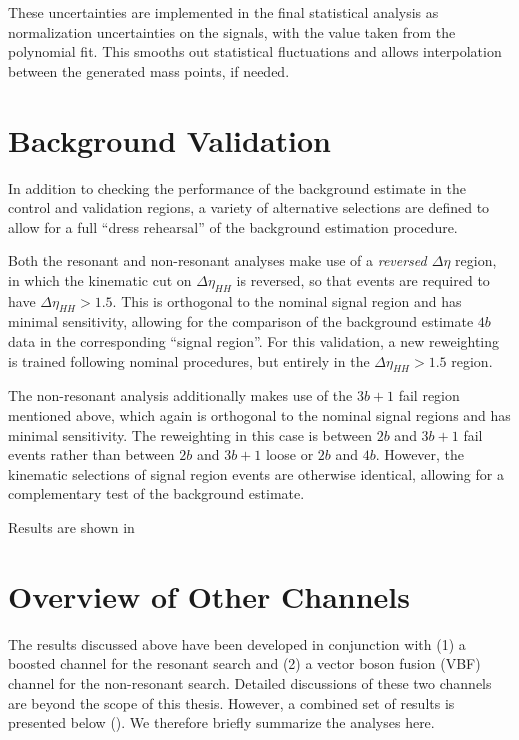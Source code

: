 These uncertainties are implemented in the final statistical analysis as normalization
uncertainties on the signals, with the value taken from the polynomial fit. This smooths
out statistical fluctuations and allows interpolation between the generated mass points, if needed.


\section{Background Validation}
In addition to checking the performance of the background estimate in the control and 
validation regions, a variety of alternative selections are defined to allow for a 
full ``dress rehearsal'' of the background estimation procedure. 

Both the resonant and non-resonant analyses make use of a \emph{reversed $\Delta \eta$}
region, in which the kinematic cut on $\Delta \eta_{HH}$ is reversed, so that events are
required to have $\Delta \eta_{HH} > 1.5$. This is orthogonal to the nominal signal 
region and has minimal sensitivity, allowing for the comparison of the background
estimate $4b$ data in the corresponding ``signal region''. For this validation, 
a new reweighting is trained following nominal procedures, but entirely in the 
$\Delta \eta_{HH} > 1.5$ region.

The non-resonant analysis additionally makes use of the $3b+1$ fail region mentioned 
above, which again is orthogonal to the nominal signal regions and has minimal sensitivity.
The reweighting in this case is between $2b$ and $3b+1$ fail events rather than between 
$2b$ and $3b+1$ loose or $2b$ and $4b$. However, the kinematic selections of signal 
region events are otherwise identical, allowing for a complementary test of the 
background estimate.


Results are shown in 

\section{Overview of Other \bbbb Channels}
The results discussed above have been developed in conjunction with (1) a boosted channel 
for the resonant search and (2) a vector boson fusion (VBF) channel for the non-resonant search. 
Detailed discussions of these two channels are beyond the scope of this thesis. However, a combined
set of results is presented below (). We therefore briefly 
summarize the analyses here.

